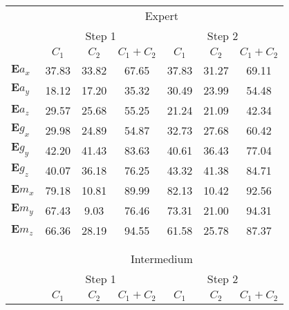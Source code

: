 \documentclass{sigchi}
\begin{document}
\begin{table}
\tiny

  \centering
  
\begin{tabular}{l c c c c c c }
\toprule



& \multicolumn{6}{c}{Expert} \\
\cmidrule(r){2-7}

& \multicolumn{3}{c}{Step 1} & \multicolumn{3}{c}{Step 2}\\
\cmidrule(lr){2-4} \cmidrule(lr){5-7}

     & $C_1$  & $C_2$  & $C_1+C_2$  & $C_1$  & $C_2$  & $C_1+C_2$  \\
\midrule

$\boldsymbol{E} a_{x}$ & 37.83 & 33.82 & 67.65 & 37.83 & 31.27 & 69.11 \\
$\boldsymbol{E} a_{y}$ & 18.12 & 17.20 & 35.32 & 30.49 & 23.99 & 54.48 \\
$\boldsymbol{E} a_{z}$ & 29.57 & 25.68 & 55.25 & 21.24 & 21.09 & 42.34 \\
$\boldsymbol{E} g_{x}$ & 29.98 & 24.89 & 54.87 & 32.73 & 27.68 & 60.42 \\
$\boldsymbol{E} g_{y}$ & 42.20 & 41.43 & 83.63 & 40.61 & 36.43 & 77.04 \\
$\boldsymbol{E} g_{z}$ & 40.07 & 36.18 & 76.25 & 43.32 & 41.38 & 84.71 \\
$\boldsymbol{E} m_{x}$ & 79.18 & 10.81 & 89.99 & 82.13 & 10.42 & 92.56 \\
$\boldsymbol{E} m_{y}$ & 67.43 & 9.03 & 76.46 & 73.31 & 21.00 & \cellcolor{blue!25}94.31 \\
$\boldsymbol{E} m_{z}$ & 66.36 & 28.19 & \cellcolor{blue!25}94.55 & 61.58 & 25.78 & 87.37   \\



\\
\\
& \multicolumn{6}{c}{Intermedium} \\
\cmidrule(r){2-7}

& \multicolumn{3}{c}{Step 1} & \multicolumn{3}{c}{Step 2}\\
\cmidrule(lr){2-4} \cmidrule(lr){5-7}
     & $C_1$  & $C_2$  & $C_1+C_2$  & $C_1$  & $C_2$  & $C_1+C_2$  \\
\midrule


\end{tabular}
\end{table}
\end{document}
